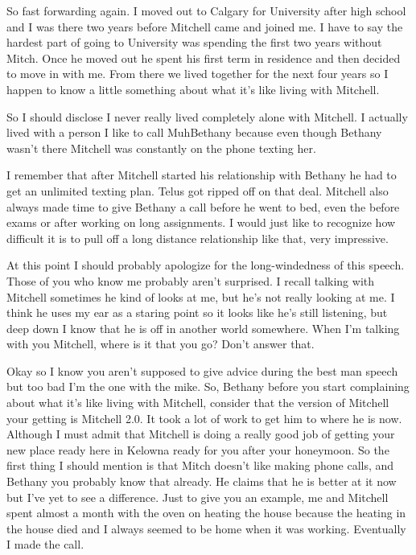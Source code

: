 So fast forwarding again. I moved out to Calgary for University after high school and I was there two years before Mitchell came and joined me. I have to say the hardest part of going to University was spending the first two years without Mitch. Once he moved out he spent his first term in residence and then decided to move in with me. From there we lived together for the next four years so I happen to know a little something about what it's like living with Mitchell.

So I should disclose I never really lived completely alone with Mitchell. I actually lived with a person I like to call MuhBethany because even though Bethany wasn't there Mitchell was constantly on the phone texting her.

I remember that after Mitchell started his relationship with Bethany he had to get an unlimited texting plan. Telus got ripped off on that deal. Mitchell also always made time to give Bethany a call before he went to bed, even the before exams or after working on long assignments. I would just like to recognize how difficult it is to pull off a long distance relationship like that, very impressive.

At this point I should probably apologize for the long-windedness of this speech. Those of you who know me probably aren't surprised. I recall talking with Mitchell sometimes he kind of looks at me, but he's not really looking at me. I think he uses my ear as a staring point so it looks like he's still listening, but deep down I know that he is off in another world somewhere. When I'm talking with you Mitchell, where is it that you go? Don't answer that.

Okay so I know you aren't supposed to give advice during the best man speech but too bad I'm the one with the mike. So, Bethany before you start complaining about what it's like living with Mitchell, consider that the version of Mitchell your getting is Mitchell 2.0. It took a lot of work to get him to where he is now. Although I must admit that Mitchell is doing a really good job of getting your new place ready here in Kelowna ready for you after your honeymoon. So the first thing I should mention is that Mitch doesn't like making phone calls, and Bethany you probably know that already. He claims that he is better at it now but I've yet to see a difference. Just to give you an example, me and Mitchell spent almost a month with the oven on heating the house because the heating in the house died and I always seemed to be home when it was working. Eventually I made the call.

